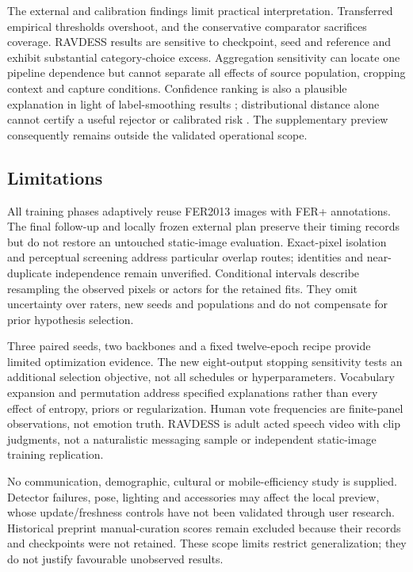 The external and calibration findings limit practical interpretation. Transferred empirical thresholds overshoot, and the conservative comparator sacrifices coverage. RAVDESS results are sensitive to checkpoint, seed and reference and exhibit substantial category-choice excess. Aggregation sensitivity can locate one pipeline dependence but cannot separate all effects of source population, cropping context and capture conditions. Confidence ranking is also a plausible explanation in light of label-smoothing results \cite{xia2025smoothing}; distributional distance alone cannot certify a useful rejector or calibrated risk \cite{baan2022calibration,guo2017calibration}. The supplementary preview consequently remains outside the validated operational scope.

\subsection{Limitations}
All training phases adaptively reuse FER2013 images with FER+ annotations. The final follow-up and locally frozen external plan preserve their timing records but do not restore an untouched static-image evaluation. Exact-pixel isolation and perceptual screening address particular overlap routes; identities and near-duplicate independence remain unverified. Conditional intervals describe resampling the observed pixels or actors for the retained fits. They omit uncertainty over raters, new seeds and populations and do not compensate for prior hypothesis selection.

Three paired seeds, two backbones and a fixed twelve-epoch recipe provide limited optimization evidence. The new eight-output stopping sensitivity tests an additional selection objective, not all schedules or hyperparameters. Vocabulary expansion and permutation address specified explanations rather than every effect of entropy, priors or regularization. Human vote frequencies are finite-panel observations, not emotion truth. RAVDESS is adult acted speech video with clip judgments, not a naturalistic messaging sample or independent static-image training replication.

No communication, demographic, cultural or mobile-efficiency study is supplied. Detector failures, pose, lighting and accessories may affect the local preview, whose update/freshness controls have not been validated through user research. Historical preprint manual-curation scores remain excluded because their records and checkpoints were not retained. These scope limits restrict generalization; they do not justify favourable unobserved results.
